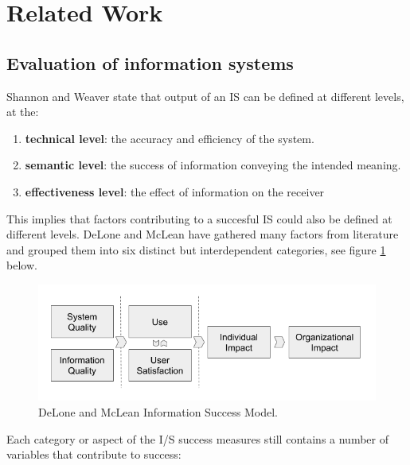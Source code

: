 \section{Related Work}



\subsection{Evaluation of information systems}
Shannon and Weaver \cite{shannon_weaver} state that output of an IS can be defined at different levels, at the:
\begin{enumerate}
\item \textbf{technical level}: the accuracy and efficiency of the system.
\item \textbf{semantic level}: the success of information conveying the intended meaning.
\item \textbf{effectiveness level}: the effect of information on the receiver 
\end{enumerate}

This implies that factors contributing to a succesful IS could also be defined at different levels. DeLone and McLean\cite{delone_mclean:1, delone_mclean:2} have gathered many factors from literature and grouped them into six distinct but interdependent categories, see figure \ref{fig:success_model} below.

\begin{figure}[h]
\includegraphics[width=1\linewidth]{images/dm_is_success_model.png}
\caption{DeLone and McLean Information Success Model.}
\label{fig:success_model}
\end{figure}

Each category or aspect of the I/S success measures still contains a number of variables that contribute to success:

